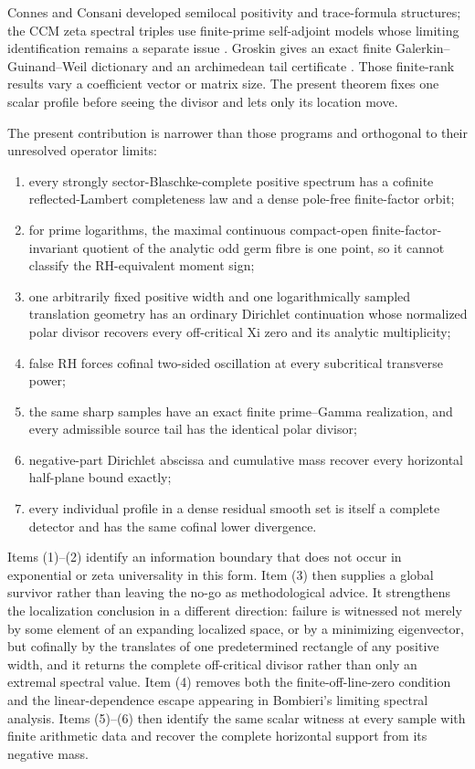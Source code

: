 \documentclass[11pt]{article}
\begin{document}
Connes and Consani developed semilocal positivity and trace-formula structures; the CCM zeta
spectral triples use finite-prime self-adjoint models whose limiting identification remains a
separate issue \cite{Connes1999,ConnesConsani2021,ConnesConsani2023,CCM2025}.  Groskin gives an
exact finite Galerkin--Guinand--Weil dictionary and an archimedean tail certificate
\cite{Groskin2026}.  Those finite-rank results vary a coefficient vector or matrix size.  The
present theorem fixes one scalar profile before seeing the divisor and lets only its location
move.

The present contribution is narrower than those programs and orthogonal to their unresolved
operator limits:
\begin{enumerate}[label=\textup{(\arabic*)}]
\item every strongly sector-Blaschke-complete positive spectrum has a cofinite reflected-Lambert
completeness law and a dense pole-free finite-factor orbit;
\item for prime logarithms, the maximal continuous compact-open finite-factor-invariant quotient
of the analytic odd germ fibre is one point, so it cannot classify the RH-equivalent moment sign;
\item one arbitrarily fixed positive width and one logarithmically sampled translation geometry
has an ordinary Dirichlet continuation whose normalized polar divisor recovers every
off-critical Xi zero and its analytic multiplicity;
\item false RH forces cofinal two-sided oscillation at every subcritical transverse power;
\item the same sharp samples have an exact finite prime--Gamma realization, and every admissible
source tail has the identical polar divisor;
\item negative-part Dirichlet abscissa and cumulative mass recover every horizontal half-plane
bound exactly;
\item every individual profile in a dense residual smooth set is itself a complete detector and
has the same cofinal lower divergence.
\end{enumerate}

Items (1)--(2) identify an information boundary that does not occur in exponential or zeta
universality in this form.  Item (3) then supplies a global survivor rather than leaving the
no-go as methodological advice.  It strengthens the localization conclusion in a different
direction: failure is
witnessed not merely by some element of an expanding localized space, or by a minimizing
eigenvector, but cofinally by the translates of one predetermined rectangle of any positive
width, and it returns the complete off-critical divisor rather than only an extremal spectral
value.  Item (4) removes both the finite-off-line-zero condition and the
linear-dependence escape appearing in Bombieri's limiting spectral analysis.  Items (5)--(6)
then identify the same scalar witness at every sample with finite arithmetic data and recover the
complete horizontal support from its negative mass.
\end{document}
